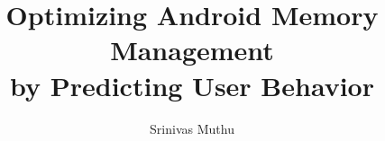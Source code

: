 \documentclass[12pt]{uthesis-v12}  %
\begin{document}

\title{Optimizing Android Memory Management
       \protect\\ by Predicting User Behavior}
       

\author{Srinivas Muthu}



\end{document}
